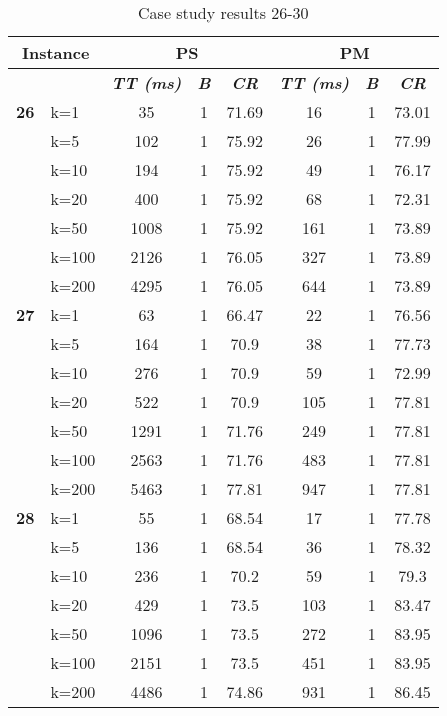     \begin{table}[htbp]
    \caption{Case study results 26-30}
    \centering
    \begin{tabular}{|l|l|c|c|c|c|c|c|}
    \hline
    \multicolumn{ 2}{|c|}{\textbf{Instance}} & \multicolumn{ 3}{c|}{\textbf{PS}} & \multicolumn{ 3}{c|}{\textbf{PM}} \\ \hline
    \multicolumn{ 2}{|l|}{} & \textbf{\textit{TT (ms)}} & \textbf{\textit{B}} & \textbf{\textit{CR}} & \textbf{\textit{TT (ms)}} & \textbf{\textit{B}} & \textbf{\textit{CR}} \\ \hline
    \multicolumn{1}{|r|}{\textbf{26}} & k=1 & 35 & 1 & 71.69 & 16 & 1 & 73.01 \\ 
     & k=5 & 102 & 1 & 75.92 & 26 & 1 & 77.99 \\ 
     & k=10 & 194 & 1 & 75.92 & 49 & 1 & 76.17 \\ 
     & k=20 & 400 & 1 & 75.92 & 68 & 1 & 72.31 \\ 
     & k=50 & 1008 & 1 & 75.92 & 161 & 1 & 73.89 \\ 
     & k=100 & 2126 & 1 & 76.05 & 327 & 1 & 73.89 \\ 
     & k=200 & 4295 & 1 & 76.05 & 644 & 1 & 73.89 \\ \hline
    \multicolumn{1}{|r|}{\textbf{27}} & k=1 & 63 & 1 & 66.47 & 22 & 1 & 76.56 \\ 
     & k=5 & 164 & 1 & 70.9 & 38 & 1 & 77.73 \\ 
     & k=10 & 276 & 1 & 70.9 & 59 & 1 & 72.99 \\ 
     & k=20 & 522 & 1 & 70.9 & 105 & 1 & 77.81 \\ 
     & k=50 & 1291 & 1 & 71.76 & 249 & 1 & 77.81 \\ 
     & k=100 & 2563 & 1 & 71.76 & 483 & 1 & 77.81 \\ 
     & k=200 & 5463 & 1 & 77.81 & 947 & 1 & 77.81 \\ \hline
    \multicolumn{1}{|r|}{\textbf{28}} & k=1 & 55 & 1 & 68.54 & 17 & 1 & 77.78 \\ 
     & k=5 & 136 & 1 & 68.54 & 36 & 1 & 78.32 \\ 
     & k=10 & 236 & 1 & 70.2 & 59 & 1 & 79.3 \\ 
     & k=20 & 429 & 1 & 73.5 & 103 & 1 & 83.47 \\ 
     & k=50 & 1096 & 1 & 73.5 & 272 & 1 & 83.95 \\ 
     & k=100 & 2151 & 1 & 73.5 & 451 & 1 & 83.95 \\ 
     & k=200 & 4486 & 1 & 74.86 & 931 & 1 & 86.45 \\ \hline

\end{tabular}
\end{table}
